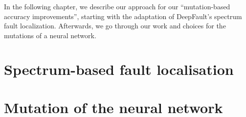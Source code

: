 In the following chapter, we describe our approach for our ``mutation-based accuracy improvements'', starting with the adaptation of DeepFault's \cite{eniser_deepfault_2019} spectrum fault localization.
Afterwards, we go through our work and choices for the mutations of a neural network.

\section{Spectrum-based fault localisation}\label{sec:spectrum-based-fault-localisation}


\section{Mutation of the neural network}\label{sec:mutation-of-the-neural-network}


